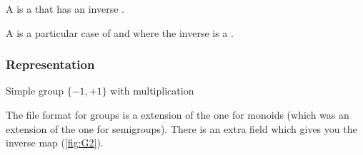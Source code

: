 
A \Group is a \Monoid that has an inverse \Mapping.


A \FiniteGroup is a particular case of \Group and \FiniteMonoid where the inverse is a \FiniteMap.


\subsubsection*{Representation}

\begin{marginfigure}%
    \caption{Simple group $\{-1,+1\}$ with multiplication}%
    \label{fig:G2}%
\end{marginfigure}%

The file format for groups is a extension of the one for monoids (which was an extension of the one for semigroups).
There is an extra field  which gives you the inverse map (\cref{fig:G2}).


